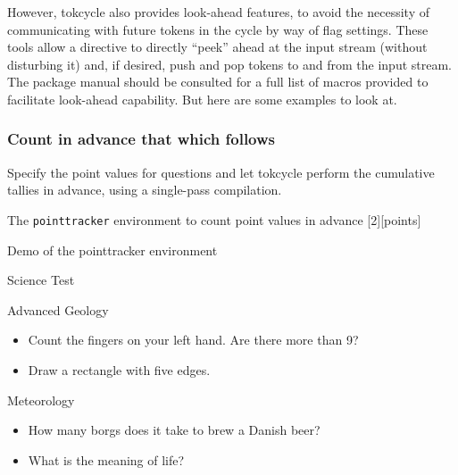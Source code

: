 \documentclass[10pt]{article}
\newcommand\TokCycle{\textsf{tokcycle}}
\begin{document}
\medskip
However, \TokCycle{} also provides look-ahead features, to avoid the necessity
  of communicating with future tokens in the cycle by way of flag settings.
These tools allow a directive to directly ``peek'' ahead at the input stream 
  (without disturbing it) and, if desired, push and pop tokens to and from 
  the input stream.
The package manual should be consulted for a full list of macros provided to
  facilitate look-ahead capability.
But here are some examples to look at.

\begingroup

\subsubsection{Count in advance that which follows}

Specify the point values for questions and let tokcycle perform the cumulative 
  tallies in advance, using a single-pass compilation.

\begin{exampleC}[]{The \texttt{pointtracker} environment to count point values
  in advance}
\newcommand\addtopoints[1]{(\textit{#1 point}%
  \ifnum#1=1\relax\else\textit{s}\fi)}
[2][points]{%
  \par\bigskip\resettokcycle
  \setcounter{pointcount}{0}%
  \def\tmp{\tokencyclexpress{\large\bfseries#2: \thepointcount\ #1}}%
  \expandafter\tmp\BODY\endtokencyclexpress
}
\def\sumpoints{\tcpop\Q\addtocounter{pointcount}{\Q}\tcpushgroup{\Q}}
\end{exampleC}

\begin{exampleA}[lefthand width=6.2cm]{Demo of the pointtracker environment}
\begin{pointtracker}{\Large Science Test}
\begin{pointtracker}{Advanced Geology}
  \begin{itemize}
    \item Count the fingers on your left hand. Are there more than 9?
    \item Draw a rectangle with five edges. 
  \end{itemize}
\end{pointtracker}
\begin{pointtracker}{Meteorology}
  \begin{itemize}
    \item How many borgs does it take to brew a Danish beer?
    \item What is the meaning of life? 
  \end{itemize}
\end{pointtracker}
\end{pointtracker}
\end{exampleA}
\end{document}

